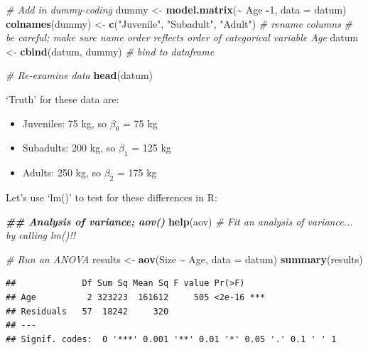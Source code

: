 \documentclass[
]{article}
\newenvironment{Shaded}{\begin{snugshade}}{\end{snugshade}}
\newcommand{\AttributeTok}[1]{\textcolor[rgb]{0.13,0.29,0.53}{#1}}
\newcommand{\CommentTok}[1]{\textcolor[rgb]{0.56,0.35,0.01}{\textit{#1}}}
\newcommand{\DecValTok}[1]{\textcolor[rgb]{0.00,0.00,0.81}{#1}}
\newcommand{\DocumentationTok}[1]{\textcolor[rgb]{0.56,0.35,0.01}{\textbf{\textit{#1}}}}
\newcommand{\FunctionTok}[1]{\textcolor[rgb]{0.13,0.29,0.53}{\textbf{#1}}}
\newcommand{\NormalTok}[1]{#1}
\newcommand{\OtherTok}[1]{\textcolor[rgb]{0.56,0.35,0.01}{#1}}
\newcommand{\SpecialCharTok}[1]{\textcolor[rgb]{0.81,0.36,0.00}{\textbf{#1}}}
\newcommand{\StringTok}[1]{\textcolor[rgb]{0.31,0.60,0.02}{#1}}
\providecommand{\tightlist}{%
  \setlength{\itemsep}{0pt}\setlength{\parskip}{0pt}}
\begin{document}
\begin{Shaded}
\begin{Highlighting}[]
\CommentTok{\# Add in dummy{-}coding}
\NormalTok{dummy }\OtherTok{\textless{}{-}} \FunctionTok{model.matrix}\NormalTok{(}\SpecialCharTok{\textasciitilde{}}\NormalTok{ Age }\SpecialCharTok{{-}}\DecValTok{1}\NormalTok{, }\AttributeTok{data =}\NormalTok{ datum)}
\FunctionTok{colnames}\NormalTok{(dummy) }\OtherTok{\textless{}{-}} \FunctionTok{c}\NormalTok{(}\StringTok{"Juvenile"}\NormalTok{, }\StringTok{"Subadult"}\NormalTok{, }\StringTok{"Adult"}\NormalTok{) }\CommentTok{\# rename columns}
\CommentTok{\# be careful; make sure name order reflects order of categorical variable \textquotesingle{}Age\textquotesingle{}}
\NormalTok{datum }\OtherTok{\textless{}{-}} \FunctionTok{cbind}\NormalTok{(datum, dummy) }\CommentTok{\# bind to dataframe}

\CommentTok{\# Re{-}examine data}
\FunctionTok{head}\NormalTok{(datum)}
\end{Highlighting}
\end{Shaded}

`Truth' for these data are:

\begin{itemize}
\tightlist
\item
  Juveniles: 75 kg, so \(\beta_0\) = 75 kg
\item
  Subadults: 200 kg, so \(\beta_1\) = 125 kg
\item
  Adults: 250 kg, so \(\beta_2\) = 175 kg
\end{itemize}

Let's use `lm()' to test for these differences in R:

\begin{Shaded}
\begin{Highlighting}[]
\DocumentationTok{\#\# Analysis of variance; \textquotesingle{}aov()\textquotesingle{}}
\FunctionTok{help}\NormalTok{(aov)}
\CommentTok{\# Fit an analysis of variance... by calling \textquotesingle{}lm()\textquotesingle{}!!}

\CommentTok{\# Run an ANOVA}
\NormalTok{results }\OtherTok{\textless{}{-}} \FunctionTok{aov}\NormalTok{(Size }\SpecialCharTok{\textasciitilde{}}\NormalTok{ Age, }\AttributeTok{data =}\NormalTok{ datum)}
\FunctionTok{summary}\NormalTok{(results)}
\end{Highlighting}
\end{Shaded}

\begin{verbatim}
##             Df Sum Sq Mean Sq F value Pr(>F)    
## Age          2 323223  161612     505 <2e-16 ***
## Residuals   57  18242     320                   
## ---
## Signif. codes:  0 '***' 0.001 '**' 0.01 '*' 0.05 '.' 0.1 ' ' 1
\end{verbatim}
\end{document}
